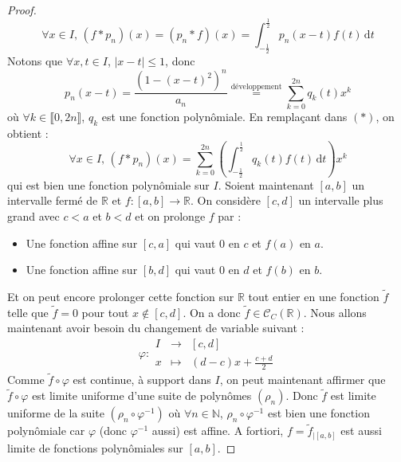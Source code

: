 \begin{proof}
		\[ \forall x \in I, \, (f*p_n)(x) = (p_n*f)(x) = \int_{-\frac{1}{2}}^{\frac{1}{2}} p_n(x-t) f(t) \, \mathrm{d}t \tag{$*$} \]
		Notons que $\forall x, t \in I$, $|x-t| \leq 1$, donc
		\[ p_n(x-t) = \frac{(1 - (x-t)^2)^n}{a_n} \overset{\text{développement}}{=} \sum_{k=0}^{2n} q_k(t) x^k \]
		où $\forall k \in \llbracket 0, 2n \rrbracket$, $q_k$ est une fonction polynômiale. En remplaçant dans $(*)$, on obtient :
		\[ \forall x \in I, \, (f*p_n)(x) = \sum_{k=0}^{2n} \left( \int_{-\frac{1}{2}}^{\frac{1}{2}} q_k(t) f(t) \, \mathrm{d}t \right) x^k \]
		qui est bien une fonction polynômiale sur $I$.
		\newpar
		Soient maintenant $[a,b]$ un intervalle fermé de $\mathbb{R}$ et $f : [a, b] \rightarrow \mathbb{R}$. On considère $[c, d]$ un intervalle plus grand avec $c < a$ et $b < d$ et on prolonge $f$ par :
		\begin{itemize}
			\item Une fonction affine sur $[c, a]$ qui vaut $0$ en $c$ et $f(a)$ en $a$.
			\item Une fonction affine sur $[b, d]$ qui vaut $0$ en $d$ et $f(b)$ en $b$.
		\end{itemize}
		Et on peut encore prolonger cette fonction sur $\mathbb{R}$ tout entier en une fonction $\widetilde{f}$ telle que $\widetilde{f} = 0$ pour tout $x \notin [c, d]$. On a donc $\widetilde{f} \in \mathcal{C}_C(\mathbb{R})$. Nous allons maintenant avoir besoin du changement de variable suivant :
		\[ \varphi :
		\begin{array}{ccc}
			I &\rightarrow& [c, d] \\
			x &\mapsto& (d-c)x + \frac{c+d}{2}
		\end{array}
		\]
		Comme $\widetilde{f} \circ \varphi$ est continue, à support dans $I$, on peut maintenant affirmer que $\widetilde{f} \circ \varphi$ est limite uniforme d'une suite de polynômes $(\rho_n)$. Donc $\widetilde{f}$ est limite uniforme de la suite $(\rho_n \circ \varphi^{-1})$ où $\forall n \in \mathbb{N}$, $\rho_n \circ \varphi^{-1}$ est bien une fonction polynômiale car $\varphi$ (donc $\varphi^{-1}$ aussi) est affine. A fortiori, $f = \widetilde{f}_{|[a,b]}$ est aussi limite de fonctions polynômiales sur $[a,b]$.
	\end{proof}

